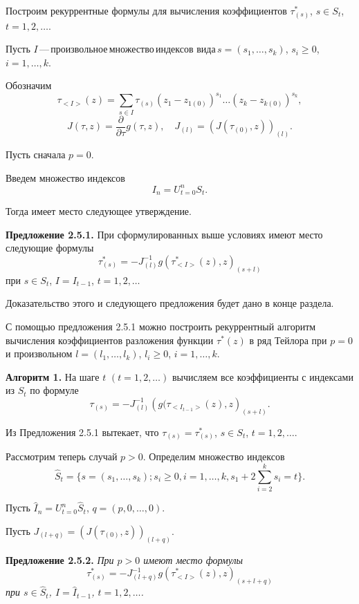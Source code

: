     Построим рекуррентные формулы для вычисления коэффициентов
    $\tau^*_{(s)}$, $s\in S_t$, $t=1,2,\ldots$.

    Пусть $I$\,---\,произвольное\,множество\,индексов
    вида\,$s=(s_1,\ldots,s_k)$, $s_i\geq 0$, $i=1,\ldots,k$.

    Обозначим
    $$
    \tau_{<I>}(z)=\sum_{s\in I}\tau_{(s)}(z_1-z_{1(0)})^{s_1}\ldots
    (z_k- z_{k(0)})^{s_k},
    $$
    $$
    J(\tau,z)=\frac{\partial}{\partial \tau}g(\tau,z),\quad
    J_{(l)}=\left(J(\tau_{(0)},z)\right)_{(l)}.
    $$

    Пусть сначала $p=0$.

    Введем множество индексов
    $$
    I_n=U^n_{t=0}S_t.
    $$

    Тогда имеет место следующее утверждение.

    \textbf{ Предложение 2.5.1.} { При сформулированных выше условиях
        имеют место следующие формулы
            $$
            \tau^*_{(s)}=-J^{-1}_{(l)}g(\tau^*_{<I>}(z),z)_{(s+l)}
        $$
            при $s\in S_t$,  $I=I_{t-1}$, $t=1,2,\ldots$ }

            Доказательство этого и следующего предложения будет дано в конце
            раздела.

            С помощью предложения 2.5.1 можно построить рекуррентный алгоритм
            вычисления коэффициентов разложения функции $\tau^*(z)$ в ряд
            Тейлора при $p=0$ и произвольном $l=(l_1,\ldots,l_k)$, $l_i\geq 0$,
            $i=1,\ldots,k$.

            \textbf{ Алгоритм 1.} На шаге $t$ $(t=1,2,\ldots)$ вычисляем все
            коэффициенты с индексами из $S_t$ по формуле
            $$
            \tau_{(s)}=-J^{-1}_{(l)}\left(g(\tau_{<I_{t-1}>}(z),z\right)_{(s+l)}.
                    $$

                    Из Предложения 2.5.1 вытекает, что $\tau_{(s)}=\tau^*_{(s)}$, $s\in
                    S_t$, $t=1,2,\ldots$.

                    Рассмотрим теперь случай $p>0$. Определим множество индексов
                    $$
                    \hat S_t=\{s=(s_1,\ldots,s_k);s_i\geq
                    0,i=1,\ldots,k,s_1+2\sum^k_{i=2} s_i=t\}.
                    $$

                    Пусть $\hat I_n= U^n_{t=0}\hat S_t$, $q=(p,0,\ldots,0)$.

                    Пусть $J_{(l+q)}=\left(J(\tau_{(0)},z)\right)_{(l+q)}$.


                    \textbf{ Предложение 2.5.2.} \textit{ При $p>0$ имеют место формулы
                    $$
                    \tau^*_{(s)}=-J^{-1}_{(l+q)}
                    g\left(\tau^*_{<I>}(z),z\right)_{(s+l+q)}
                    $$
                        при $s\in \hat S_t$, $I=\hat I_{t-1}$, $t=1,2,\ldots$. }


